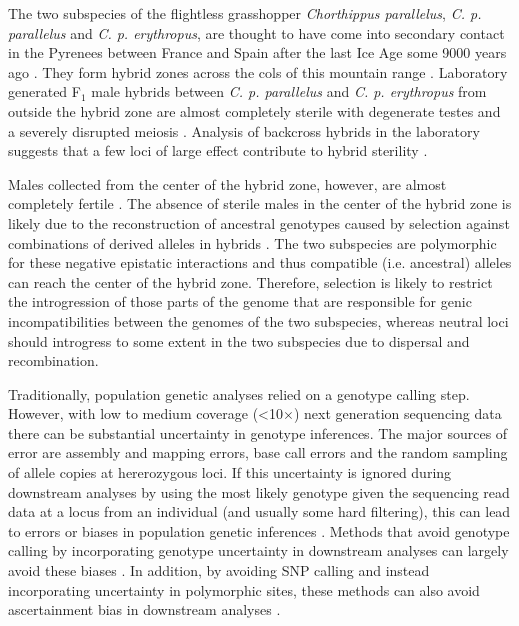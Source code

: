 \documentclass[a4paper,12pt,times,authoryear,twoside,print,index]{Classes/PhDThesisPSnPDF}\usepackage[]{graphicx}\usepackage[]{color}
\begin{document}
The two subspecies of the flightless grasshopper \textit{Chorthippus parallelus}, \textit{C. p. parallelus} and \textit{C. p. erythropus}, are thought to have come into secondary contact in the Pyrenees between France and Spain after the last Ice Age some 9000 years ago \citep{Hewitt1990}. They form hybrid zones across the cols of this mountain range \citep{Butlin1985,Butlin1985a}. 
Laboratory generated F$_{1}$ male hybrids between \textit{C. p. parallelus} and \textit{C. p. erythropus} from outside the hybrid zone are almost completely sterile with degenerate testes and a severely disrupted meiosis \citep{Hewitt1987}. Analysis of backcross hybrids in the laboratory suggests that a few loci of large effect contribute to hybrid sterility \citep{Llewellyn2008}. 

Males collected from the center of the hybrid zone, however, are almost completely fertile \citep{Ritchie1992}. The absence of sterile males in the center of the hybrid zone is likely due to the reconstruction of ancestral genotypes caused by selection against combinations of derived alleles in hybrids \citep{Butlin1998a}. The two subspecies are polymorphic for these negative epistatic interactions \citep{Shuker2005} and thus compatible (i.e. ancestral) alleles can reach the center of the hybrid zone. Therefore, selection is likely to restrict the introgression of those parts of the genome that are responsible for genic incompatibilities between the genomes of the two subspecies, whereas neutral loci should introgress to some extent in the two subspecies due to dispersal and recombination. 


Traditionally, population genetic analyses relied on a genotype calling step. However, with low to medium coverage (<10$\times$) next generation sequencing data there can be substantial uncertainty in genotype inferences. The major sources of error are assembly and mapping errors, base call errors and the random sampling of allele copies at hererozygous loci. If this uncertainty is ignored during downstream analyses by using the most likely genotype given the sequencing read data at a locus from an individual (and usually some hard filtering), this can lead to errors or biases in population genetic inferences \citep{Crawford2012a, Johnson2008}. Methods that avoid genotype calling by incorporating genotype uncertainty in downstream analyses can largely avoid these biases \citep{Nielsen2012, Li2011}. In addition, by avoiding SNP calling and instead incorporating uncertainty in polymorphic sites, these methods can also avoid ascertainment bias in downstream analyses \citep{Albrechtsen2010}. 
\end{document}
